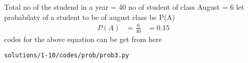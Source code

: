 Total no of the studend in a year = 40
no of student of class August  = 6
let probabilaty of a student to be of august class  be P(A)
\begin{align}
P(A) &= \frac{6}{40}
&=0.15
\end{align}
codes for the above equation can be get from here
\begin{lstlisting}
solutions/1-10/codes/prob/prob3.py
\end{lstlisting}
